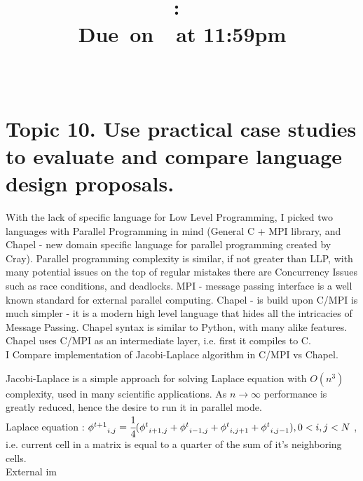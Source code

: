 \documentclass{article}
\title{
    \vspace{2in}
    \textmd{\textbf{\hmwkClass:\ \hmwkTitle}}\\
        \normalsize\vspace{0.1in}\small{Due\ on\ \hmwkDueDate\ at 11:59pm}\\
        \vspace{0.1in}\large{\textit{\hmwkClassInstructor\ \hmwkClassTime}}
    \vspace{3in}
}
\author{\textbf{\hmwkAuthorName}}
\date{}
\begin{document}
\maketitle

\pagebreak

        \section{Topic 10.  Use practical case studies to evaluate and compare language design proposals.}


        With the lack of specific language for Low Level Programming, I picked two languages with
        Parallel Programming in mind (General C + MPI library, and Chapel - new domain specific
        language for parallel programming created by Cray). 
        Parallel programming complexity is similar, if not greater than
        LLP, with many potential issues on the top of regular mistakes there are Concurrency Issues
        such as race conditions, and deadlocks.
        MPI - message passing interface is a well known standard for external parallel computing.
        Chapel - is build upon C/MPI is much simpler - it is a modern high level language that hides
        all the intricacies of Message Passing. Chapel syntax is similar to Python, with many alike
        features. Chapel uses C/MPI as an intermediate layer, i.e. first it compiles to C.\\
    
        I Compare implementation of Jacobi-Laplace algorithm in C/MPI vs Chapel. 
        
        Jacobi-Laplace is a
        simple approach for solving Laplace equation with $O(n^3)$ complexity, used in many
        scientific applications. As $n\rightarrow \infty$ performance is greatly reduced, hence the
        desire to run it in parallel mode.\\
        Laplace equation : 
        ${\phi^{t+1}}_{i,j} = \cfrac{1}{4} ({\phi^{t}}_{i+1,j} + {\phi^{t}}_{i-1,j} +
        {\phi^{t}}_{i,j+1} + {\phi^{t}}_{i,j-1}), 0 < i, j< N$ , i.e. current cell in a matrix is
        equal to a quarter of the sum of it's neighboring cells.\\
    
        External im
        
\end{document}

